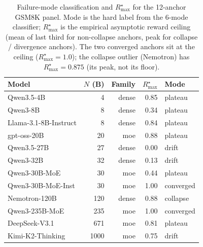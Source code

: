 \begin{table}[t]
\centering
\small
\caption{Failure-mode classification and $R_\mathrm{max}^\star$ for the
12-anchor GSM8K panel.  Mode is the hard label from the 6-mode
classifier; $R_\mathrm{max}^\star$ is the empirical asymptotic reward
ceiling (mean of last third for non-collapse anchors, peak for
collapse / divergence anchors).  The two converged anchors sit at the
ceiling ($R_\mathrm{max}^\star = 1.0$); the collapse outlier (Nemotron)
has $R_\mathrm{max}^\star = 0.875$ (its peak, not its floor).
\label{tab:iter105-modes}}
\begin{tabular}{lrrrl}
\toprule
Model & $N$ (B) & Family & $R_\mathrm{max}^\star$ & Mode \\
\midrule
Qwen3.5-4B            &    4 & dense & 0.85 & plateau \\
Qwen3-8B              &    8 & dense & 0.34 & plateau \\
Llama-3.1-8B-Instruct &    8 & dense & 0.84 & plateau \\
gpt-oss-20B           &   20 & moe   & 0.88 & plateau \\
Qwen3.5-27B           &   27 & dense & 0.00 & drift \\
Qwen3-32B             &   32 & dense & 0.13 & drift \\
Qwen3-30B-MoE         &   30 & moe   & 0.44 & plateau \\
Qwen3-30B-MoE-Inst    &   30 & moe   & 1.00 & converged \\
Nemotron-120B         &  120 & dense & 0.88 & collapse \\
Qwen3-235B-MoE        &  235 & moe   & 1.00 & converged \\
DeepSeek-V3.1         &  671 & moe   & 0.81 & plateau \\
Kimi-K2-Thinking      & 1000 & moe   & 0.75 & drift \\
\bottomrule
\end{tabular}
\end{table}